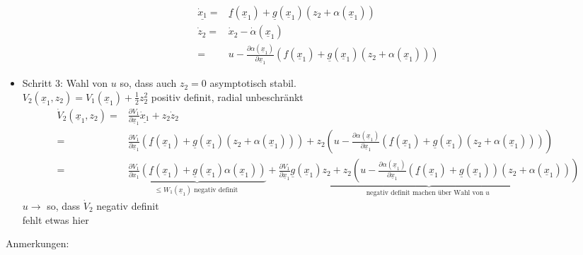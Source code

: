 \documentclass[ngerman]{tudscrreprt}
\begin{document}
\begin{itemize}
\begin{align*}
\underline {\dot x_1} =& \underline f(\underline x_1) + \underline g(\underline x_1) (z_2 + \alpha(\underline x_1))\\
\dot z_2 = & \dot x_2 - \dot \alpha(\underline x_1)\\
=& u - \frac{\partial \alpha(\underline x_1)}{\partial \underline x_1} (f(\underline x_1) + \underline g(\underline x_1)(z_2 + \alpha(\underline x_1)) )
\end{align*}
\item Schritt 3: Wahl von $ u $ so, dass auch $z_2 = 0$ asymptotisch stabil.\\ $V_2(\underline x_1,z_2) = V_1(\underline x_1) + \frac{1}{2}z_2^2$ positiv definit, radial unbeschränkt\\
\begin{align*}
\dot V_2(\underline x_1, z_2) =& \frac{\partial V_1}{\partial \underline x_1} \underline{\dot x_1} + z_2 \dot z_2\\
=& \frac{\partial V_1}{\partial \underline x_1} \left(\underline f(\underline x_1)+ \underline g(\underline x_1)(z_2 + \alpha(\underline x_1)) \right) + z_2\left(u -\frac{\partial \alpha(\underline x_1)}{\partial \underline x_1} (\underline f(\underline x_1) + \underline g(\underline x_1)(z_2 + \alpha(\underline x_1) ) ) \right)\\
=& \underbrace{\frac{\partial V_1}{\partial x_1}(\underline f(\underline x_1) + \underline g(\underline x_1)\alpha(\underline x_1) ) }_{\le W_1(\underline x_1) \text{ negativ definit }} + \underbrace{\frac{\partial V_1}{\partial \underline x_1}\underline g(\underline x_1) z_2 + z_2\left(u - \frac{\partial \alpha(\underline x_1)}{\partial \underline x_1} (\underline f(\underline x_1) + \underline g(\underline x_1))(z_2 + \alpha(\underline x_1) ) \right) }_{\text{ negativ definit machen über Wahl von $u$ }}
\end{align*}
$u \rightarrow $ so, dass $\dot V_2$ negativ definit \\fehlt etwas hier
\end{itemize}
Anmerkungen: 
\end{document}
